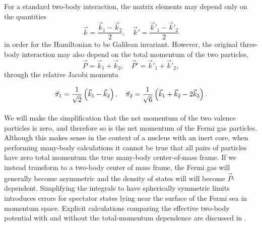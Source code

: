 For a standard two-body interaction, the matrix elements may depend only on the quantities
 \begin{equation}
 \vec{k}=\frac{\vec{k}_1-\vec{k}_2}{2},\quad \vec{k}'=\frac{\vec{k}'_1-\vec{k}'_2}{2}
 \end{equation}
 in order for the Hamiltonian to be Galilean invariant. However, the original three-body interaction may also depend on the total momentum of the two particles,
 \begin{equation}
 \vec{P}=\vec{k}_1+\vec{k}_2, \quad  \vec{P}'=\vec{k}'_1+\vec{k}'_2,
 \end{equation}
 through the relative Jacobi momenta 
 \begin{equation}
 \vec{\pi}_1=\frac{1}{\sqrt{2}}\left(\vec{k}_1-\vec{k}_2\right), \quad  \vec{\pi}_2=\frac{1}{\sqrt{6}}\left(\vec{k}_1+\vec{k}_2-2\vec{k}_3\right).\vphantom{\Bigg(_2}
 \end{equation}
\nopagebreak[4]
\par We will make the simplification that the net momentum of the two valence particles is zero, and therefore so is the net momentum of the Fermi gas particles. Although this makes sense in the context of a nucleus with an inert core, when performing many-body calculations it cannot be true that all pairs of particles have zero total momentum the true many-body center-of-mass frame. If we instead transform to a two-body center of mass frame, the Fermi gas will generally become asymmetric and the density of states will will become $\vec{P}$-dependent. Simplifying the integrals to have spherically symmetric limits introduces errors for spectator states lying near the surface of the Fermi sea in momentum space. Explicit calculations comparing the effective two-body potential with and without the total-momentum dependence are discussed in \cite{Drischler:2015eba}.
 

